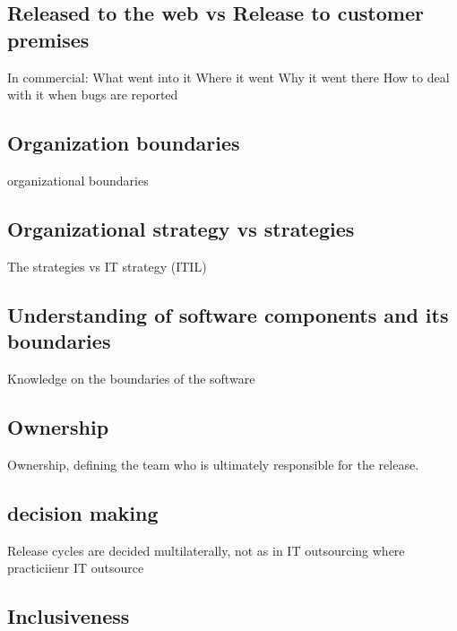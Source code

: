  
 \subsection{Released to the web vs Release to customer premises}
 
 In commercial: 
     What went into it
    Where it went
    Why it went there
    How to deal with it when bugs are reported
 
  
 \subsection{Organization boundaries}
 organizational boundaries \\ 
 
 
 \subsection{Organizational strategy vs strategies}
 
 The strategies vs IT strategy (ITIL) 

 \subsection{Understanding of software components and its boundaries}

 Knowledge on the boundaries of the software \\ 
 
 \subsection{ Ownership }
 
 Ownership, defining the team who is ultimately responsible for the release.
 
 

 
 \subsection{decision making}
 
 
  Release cycles are decided multilaterally, not as in IT outsourcing where practiciienr IT outsource  \\ 

 
 \subsection{Inclusiveness}
 
 
 
 
 
